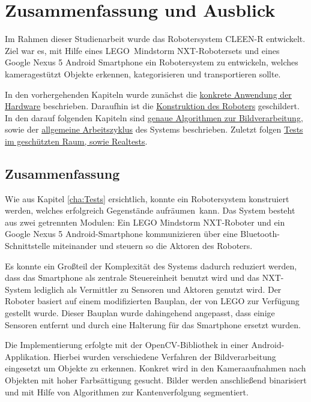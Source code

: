 \chapter{Zusammenfassung und Ausblick}
\label{cha:Fazit}

Im Rahmen dieser Studienarbeit wurde das Robotersystem CLEEN-R entwickelt. Ziel war es, mit Hilfe eines LEGO\textregistered\ Mindstorm NXT-Robotersets und eines Google Nexus 5 Android Smartphone ein Robotersystem zu entwickeln, welches kameragestützt Objekte erkennen, kategorisieren und transportieren sollte. 

In den vorhergehenden Kapiteln wurde zunächst die \hyperref[cha:Materials]{konkrete Anwendung der Hardware}  beschrieben. Daraufhin ist die \hyperref[cha:robot]{Konstruktion des Roboters} geschildert. In den darauf folgenden Kapiteln sind \hyperref[cha:Software]{genaue Algorithmen zur Bildverarbeitung}, sowie der \hyperref[cha:Workloop]{allgemeine Arbeitszyklus} des Systems beschrieben. Zuletzt folgen \hyperref[cha:Tests]{Tests im geschützten Raum, sowie Realtests}.

\section{Zusammenfassung}

Wie aus Kapitel \ref{cha:Tests} ersichtlich, konnte ein Robotersystem konstruiert werden, welches erfolgreich Gegenstände \glqq aufräumen\grqq\ kann. Das System besteht aus zwei getrennten Modulen: Ein LEGO Mindstorm NXT-Roboter und ein Google Nexus 5 Android-Smartphone kommunizieren über eine Bluetooth-Schnittstelle miteinander und steuern so die Aktoren des Roboters. 

Es konnte ein Großteil der Komplexität des Systems dadurch reduziert werden, dass das Smartphone als zentrale Steuereinheit benutzt wird und das NXT-System lediglich als Vermittler zu Sensoren und Aktoren genutzt wird. Der Roboter basiert auf einem modifizierten Bauplan, der von LEGO zur Verfügung gestellt wurde. Dieser Bauplan wurde dahingehend angepasst, dass einige Sensoren entfernt und durch eine Halterung für das Smartphone ersetzt wurden.

Die Implementierung erfolgte mit der OpenCV-Bibliothek in einer Android-Applikation. Hierbei wurden verschiedene Verfahren der Bildverarbeitung eingesetzt um Objekte zu erkennen. Konkret wird in den Kameraaufnahmen nach Objekten mit hoher Farbsättigung gesucht. Bilder werden anschließend binarisiert und mit Hilfe von Algorithmen zur Kantenverfolgung segmentiert. 

